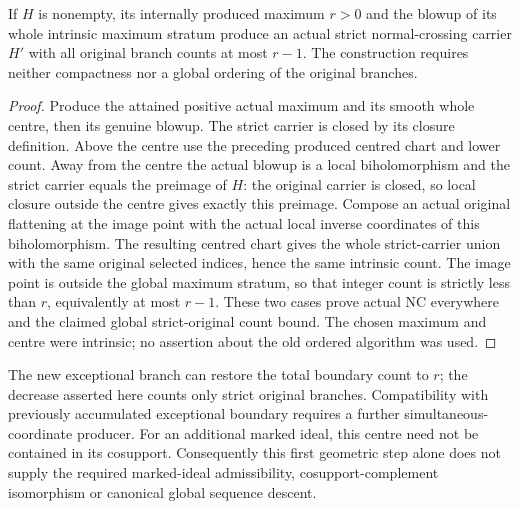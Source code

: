 \begin{theorem}
\label{hir:general-nc-highest-stratum-global-strict-count-decrease}
\leanok
If $H$ is nonempty, its internally produced maximum $r>0$ and the
blowup of its whole intrinsic maximum stratum produce an actual strict
normal-crossing carrier $H'$ with all original branch counts at most
$r-1$. The construction requires neither compactness nor a global
ordering of the original branches.
\end{theorem}
\begin{proof}
Produce the attained positive actual maximum and its smooth whole
centre, then its genuine blowup. The strict carrier is closed by its
closure definition. Above the centre use the preceding produced
centred chart and lower count. Away from the centre the actual blowup
is a local biholomorphism and the strict carrier equals the preimage
of $H$: the original carrier is closed, so local closure outside the
centre gives exactly this preimage. Compose an actual original
flattening at the image point with the actual local inverse coordinates
of this biholomorphism. The resulting centred chart gives the whole
strict-carrier union with the same original selected indices, hence
the same intrinsic count. The image point is outside the global
maximum stratum, so that integer count is strictly less than $r$,
equivalently at most $r-1$. These two cases prove actual NC everywhere
and the claimed global strict-original count bound. The chosen maximum
and centre were intrinsic; no assertion about the old ordered algorithm
was used.
\end{proof}

\begin{remark}
The new exceptional branch can restore the total boundary count to $r$;
the decrease asserted here counts only strict original branches.
Compatibility with previously accumulated exceptional boundary requires
a further simultaneous-coordinate producer. For an additional marked
ideal, this centre need not be contained in its cosupport. Consequently
this first geometric step alone does not supply the required marked-ideal
admissibility, cosupport-complement isomorphism or canonical global
sequence descent.
\end{remark}
